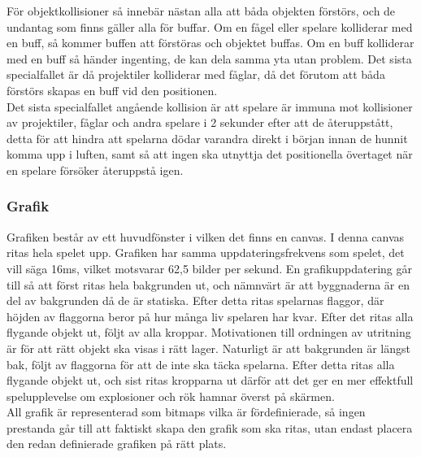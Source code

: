 \documentclass[12pt,a4paper]{article}
\begin{document}
För objektkollisioner så innebär nästan alla att båda objekten förstörs, och de undantag som finns gäller alla för buffar. Om en fågel eller spelare kolliderar med en buff, så kommer buffen att förstöras och objektet buffas. Om en buff kolliderar med en buff så händer ingenting, de kan dela samma yta utan problem. Det sista specialfallet är då projektiler kolliderar med fåglar, då det förutom att båda förstörs skapas en buff vid den positionen. \\

Det sista specialfallet angående kollision är att spelare är immuna mot kollisioner av projektiler, fåglar och andra spelare i 2 sekunder efter att de återuppstått, detta för att hindra att spelarna dödar varandra direkt i början innan de hunnit komma upp i luften, samt så att ingen ska utnyttja det positionella övertaget när en spelare försöker återuppstå igen.

\subsubsection{Grafik}
Grafiken består av ett huvudfönster i vilken det finns en canvas. I denna canvas ritas hela spelet upp. Grafiken har samma uppdateringsfrekvens som spelet, det vill säga 16ms, vilket motsvarar 62,5 bilder per sekund. En grafikuppdatering går till så att först ritas hela bakgrunden ut, och nämnvärt är att byggnaderna är en del av bakgrunden då de är statiska. Efter detta ritas spelarnas flaggor, där höjden av flaggorna beror på hur många liv spelaren har kvar. Efter det ritas alla flygande objekt ut, följt av alla kroppar. Motivationen till ordningen av utritning är för att rätt objekt ska visas i rätt lager. Naturligt är att bakgrunden är längst bak, följt av flaggorna för att de inte ska täcka spelarna. Efter detta ritas alla flygande objekt ut, och sist ritas kropparna ut därför att det ger en mer effektfull spelupplevelse om explosioner och rök hamnar överst på skärmen. \\

All grafik är representerad som bitmaps vilka är fördefinierade, så ingen prestanda går till att faktiskt skapa den grafik som ska ritas, utan endast placera den redan definierade grafiken på rätt plats.
\end{document}
